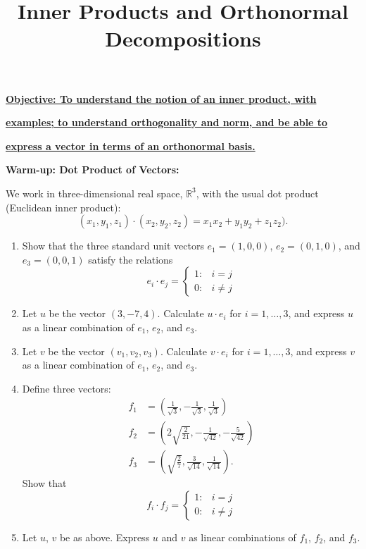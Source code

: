 \documentclass{article}
\begin{document}
\title{Inner Products and Orthonormal Decompositions}
\date{}

\maketitle
\thispagestyle{empty}

\Large

\textbf{\underline{Objective: To understand the notion of an inner product, with}}

\textbf{\underline{examples; to understand orthogonality and norm, and be able to}}

\textbf{\underline{express a vector in terms of an orthonormal basis.}}






\vspace{5mm}







\textbf{Warm-up: Dot Product of Vectors:}\bigskip


We work in three-dimensional real space, $\mathbb{R}^3$, with the usual dot product (Euclidean inner product):
\[(x_1,y_1,z_1)\cdot (x_2,y_2,z_2)=x_1x_2+y_1y_2+z_1z_2).\]



\begin{enumerate}
	\item Show that the three standard unit vectors $e_1=(1,0,0)$, $e_2=(0,1,0)$, and $e_3=(0,0,1)$ satisfy the relations
		\[e_i\cdot e_j = \begin{cases} 1: & i=j\\ 0: & i\neq j\end{cases}\]
	\item Let $u$ be the vector $(3,-7,4)$. Calculate $u\cdot e_i$ for $i=1,\hdots,3$, and express $u$ as a linear combination of $e_1$, $e_2$, and $e_3$.
	\item Let $v$ be the vector $(v_1,v_2,v_3)$. Calculate $v\cdot e_i$ for $i=1,\hdots,3$, and express $v$ as a linear combination of $e_1$, $e_2$, and $e_3$.
	\item Define three vectors:
		\begin{align*}
			f_1&=\left(\frac{1}{\sqrt{3}},-\frac{1}{\sqrt{3}},\frac{1}{\sqrt{3}}\right)\\
			f_2&= \left(2\sqrt{\frac{2}{21}},-\frac{1}{\sqrt{42}}, -\frac{5}{\sqrt{42}}\right)\\
			f_3&= \left(\sqrt{\frac{2}{7}},\frac{3}{\sqrt{14}},\frac{1}{\sqrt{14}}\right).
		\end{align*}
		Show that
		\[f_i\cdot f_j=\begin{cases} 1: & i=j\\ 0: & i\neq j\end{cases}\]
	\item Let $u$, $v$ be as above. Express $u$ and $v$ as linear combinations of $f_1$, $f_2$, and $f_3$.
\end{enumerate}
\end{document}
